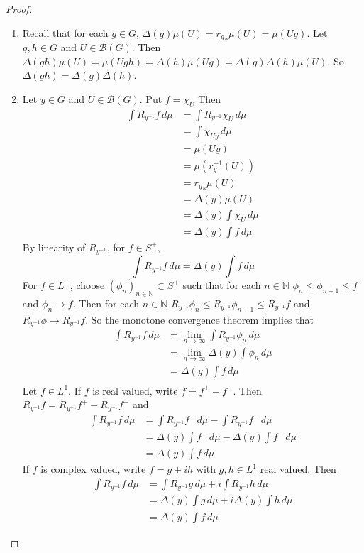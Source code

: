 \documentclass{book}
\theoremstyle{definition}
\newcommand{\Del}{\Delta}
\newcommand{\N}{\mathbb{N}}
\newcommand{\MB}{\mathcal{B}}
\DeclareMathOperator*{\0}{\mbf{0}}
\DeclareMathOperator*{\1}{\mbf{1}}
\newcommand{\limn}{\lim \limits_{n \rightarrow \infty}}
\newcommand{\seq}[2]{(#1_{#2})_{#2 \in \N}}
\newcommand{\dmu}{\, d \mu}
\begin{document}
	\begin{proof}\
		\begin{enumerate}
			\item Recall that for each $g \in G$, $\Del(g)\mu(U) = {r_g}_*\mu(U) = \mu(Ug)$. Let $g, h \in G$ and $U \in \MB(G)$. Then $\Del(gh)\mu(U) = \mu(Ugh) = \Del(h)\mu(Ug) = \Del(g) \Del(h)\mu(U)$. So $\Del(gh) = \Del(g) \Del(h)$.
			\item Let $y \in G$ and $U \in \MB(G)$. Put $f = \chi_U$ Then 
			\begin{align*}
				\int R_{y^{-1}} f \dmu 
				& = \int R_{y^{-1}} \chi_U \dmu \\
				& = \int \chi_{Uy} \dmu \\
				& = \mu(Uy) \\
				&= \mu(r_y^{-1}(U)) \\
				&= {r_y}_* \mu(U) \\
				& = \Del(y) \mu(U) \\
				& = \Del(y)  \int \chi_U \dmu \\
				&= \Del(y)  \int f \dmu
			\end{align*}
			By linearity of $R_{y^{-1}}$, for $f \in S^+$, $$\int R_{y^{-1}} f \dmu = \Del(y) \int f \dmu$$
			For $f \in L^+$, choose $\seq{\phi}{n} \subset S^+$ such that for each $n \in \N$ $\phi_n \leq \phi_{n+1} \leq f$ and $\phi_n \rightarrow f$. Then for each $n \in \N$ $R_{y^{-1}} \phi_n \leq R_{y^{-1}} \phi_{n+1} \leq R_{y^{-1}} f$ and $R_{y^{-1}} \phi \rightarrow R_{y^{-1}} f$. So the monotone convergence theorem implies that 
			\begin{align*}
				\int R_{y^{-1}} f \dmu 
				& = \limn \int R_{y^{-1}} \phi_n \dmu \\
				& = \limn \Del(y) \int \phi_n \dmu \\
				& = \Del(y) \int f \dmu \\
			\end{align*}
			Let $f \in L^1$. If $f$ is real valued, write $f = f^+ - f^-$. Then $R_{y^{-1}} f = R_{y^{-1}} f^+ - R_{y^{-1}} f^-$ and 
			\begin{align*}
				\int R_{y^{-1}} f \dmu 
				& = \int R_{y^{-1}} f^+ \dmu - \int R_{y^{-1}} f^- \dmu \\
				& = \Del(y) \int f^+ \dmu - \Del(y) \int f^- \dmu \\
				& = \Del(y) \int f \dmu
			\end{align*}
			If $f$ is complex valued, write $f = g + ih$ with $g, h \in L^1$ real valued. Then 
			\begin{align*}
				\int R_{y^{-1}} f \dmu 
				& = \int R_{y^{-1}} g \dmu + i \int R_{y^{-1}} h \dmu \\
				& = \Del(y) \int g \dmu +i \Del(y) \int h \dmu \\
				& = \Del(y) \int f \dmu
			\end{align*}
		\end{enumerate}
	\end{proof}
\end{document}
